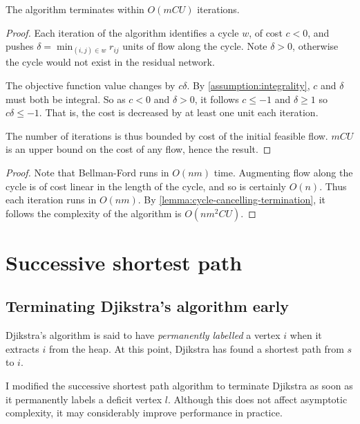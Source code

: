 \begin{lemma} \label{lemma:cycle-cancelling-termination}
    The algorithm terminates within $O(mCU)$ iterations\footnotemark.
\end{lemma}
\begin{proof}
    Each iteration of the algorithm identifies a cycle $w$, of cost $c < 0$, and pushes $\delta = \min_{(i,j) \in w} r_{ij}$ units of flow along the cycle. Note $\delta > 0$, otherwise the cycle would not exist in the residual network. 
    
    The objective function value changes by $c\delta$.  By \cref{assumption:integrality}, $c$ and $\delta$ must both be integral. So as $c < 0$ and $\delta > 0$, it follows $c \leq -1$ and $\delta \geq 1$ so $c\delta \leq -1$. That is, the cost is decreased by at least one unit each iteration.
    
    The number of iterations is thus bounded by cost of the initial feasible flow. $mCU$ is an upper bound on the cost of any flow, hence the result.
\end{proof}

\cccomplexity*
\begin{proof}
    Note that Bellman-Ford runs in $O(nm)$ time. Augmenting flow along the cycle is of cost linear in the length of the cycle, and so is certainly $O(n)$. Thus each iteration runs in $O(nm)$. By \cref{lemma:cycle-cancelling-termination}, it follows the complexity of the algorithm is $O(nm^2CU)$.
\end{proof}

\section{Successive shortest path} \label{appendix:impl-ssp}

\subsection{Terminating Djikstra's algorithm early} \label{appendix:impl-ssp:partial-djikstra}

Djikstra's algorithm is said to have \emph{permanently labelled} a vertex $i$ when it extracts $i$ from the heap. At this point, Djikstra has found a shortest path from $s$ to $i$.

I modified the successive shortest path algorithm to terminate Djikstra as soon as it permanently labels a deficit vertex $l$. Although this does not affect asymptotic complexity, it may considerably improve performance in practice.\\

